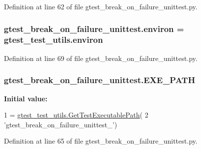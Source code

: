 Definition at line 62 of file gtest\+\_\+break\+\_\+on\+\_\+failure\+\_\+unittest.\+py.

\subsubsection[{\texorpdfstring{environ}{environ}}]{\setlength{\rightskip}{0pt plus 5cm}gtest\+\_\+break\+\_\+on\+\_\+failure\+\_\+unittest.\+environ = gtest\+\_\+test\+\_\+utils.\+environ}\hypertarget{namespacegtest__break__on__failure__unittest_a6d74240e4ea26e0a68e1025f9b8c878d}{}\label{namespacegtest__break__on__failure__unittest_a6d74240e4ea26e0a68e1025f9b8c878d}


Definition at line 69 of file gtest\+\_\+break\+\_\+on\+\_\+failure\+\_\+unittest.\+py.

\subsubsection[{\texorpdfstring{E\+X\+E\+\_\+\+P\+A\+TH}{EXE_PATH}}]{\setlength{\rightskip}{0pt plus 5cm}gtest\+\_\+break\+\_\+on\+\_\+failure\+\_\+unittest.\+E\+X\+E\+\_\+\+P\+A\+TH}\hypertarget{namespacegtest__break__on__failure__unittest_a4c5b1b2e2a550d75bf9f38ef24e76702}{}\label{namespacegtest__break__on__failure__unittest_a4c5b1b2e2a550d75bf9f38ef24e76702}
{\bfseries Initial value\+:}
\begin{DoxyCode}
1 = \hyperlink{namespacegtest__test__utils_a89ed3717984a80ffbb7a9c92f71b86a2}{gtest\_test\_utils.GetTestExecutablePath}(
2     \textcolor{stringliteral}{'gtest\_break\_on\_failure\_unittest\_'})
\end{DoxyCode}


Definition at line 65 of file gtest\+\_\+break\+\_\+on\+\_\+failure\+\_\+unittest.\+py.

